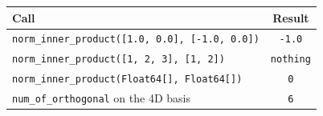 \documentclass[11pt]{article}
\begin{document}
\begin{center}
\begin{tabular}{lc}
\toprule
Call & Result \\
\midrule
\texttt{norm\_inner\_product([1.0, 0.0], [-1.0, 0.0])} & \texttt{-1.0} \\
\texttt{norm\_inner\_product([1, 2, 3], [1, 2])} & \texttt{nothing} \\
\texttt{norm\_inner\_product(Float64[], Float64[])} & \texttt{0} \\
\texttt{num\_of\_orthogonal} on the 4D basis & \texttt{6} \\
\bottomrule
\end{tabular}
\end{center}
\end{document}
